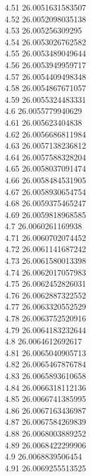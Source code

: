 {4.51	26.0051631583507\\
4.52	26.0052098035138\\
4.53	26.005256309295\\
4.54	26.0053026762582\\
4.55	26.0053489049644\\
4.56	26.0053949959717\\
4.57	26.0054409498348\\
4.58	26.0054867671057\\
4.59	26.0055324483331\\
4.6	26.0055779940629\\
4.61	26.005623404838\\
4.62	26.0056686811984\\
4.63	26.0057138236812\\
4.64	26.0057588328204\\
4.65	26.0058037091474\\
4.66	26.0058484531905\\
4.67	26.0058930654754\\
4.68	26.0059375465247\\
4.69	26.0059818968585\\
4.7	26.0060261169938\\
4.71	26.0060702074452\\
4.72	26.0061141687242\\
4.73	26.0061580013398\\
4.74	26.0062017057983\\
4.75	26.0062452826031\\
4.76	26.0062887322552\\
4.77	26.0063320552529\\
4.78	26.0063752520916\\
4.79	26.0064183232644\\
4.8	26.0064612692617\\
4.81	26.0065040905713\\
4.82	26.0065467876784\\
4.83	26.0065893610658\\
4.84	26.0066318112136\\
4.85	26.0066741385995\\
4.86	26.0067163436987\\
4.87	26.0067584269839\\
4.88	26.0068003889252\\
4.89	26.0068422299906\\
4.9	26.0068839506454\\
4.91	26.0069255513525\\
}
